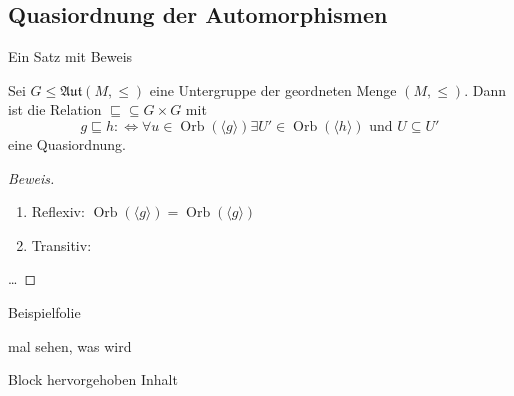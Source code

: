 \documentclass[presentation,t]{beamer}
\DeclareMathOperator\Orb{Orb}%
\begin{document}
\subsection{Quasiordnung der Automorphismen}
\label{sec:orgead3172}
\begin{frame}[label={sec:org76bab90}]{Ein Satz mit Beweis}
\begin{theorem}[Quasiordnung]
Sei \(G\leq \mathfrak{Aut}(M,\leq)\) eine Untergruppe der geordneten
Menge \((M,\leq)\). Dann ist die Relation \({\sqsubseteq}\subseteq
G\times G\) mit 
\[
g\sqsubseteq h :\Leftrightarrow ∀u∈\Orb(〈g〉)∃U'∈\Orb(〈h〉)\text{ und }U\subseteq U'
\]
eine Quasiordnung.
\end{theorem}

\begin{proof}[Beweis]
\begin{enumerate}
\item Reflexiv: \(\Orb(〈g〉) = \Orb(〈g〉)\)
\item Transitiv:
\end{enumerate}
\dots
\end{proof}
\end{frame}
\begin{frame}[label={sec:org0b7204d}]{Beispielfolie}
\begin{example}[Beispieltitel]
mal sehen, was wird
\end{example}
\begin{alertblock}{Block hervorgehoben}
Inhalt
\end{alertblock}
\end{frame}
\end{document}
